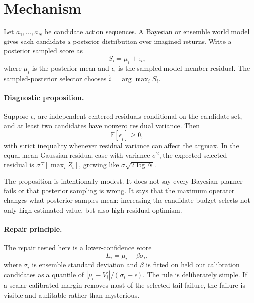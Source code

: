 \documentclass{article}
\begin{document}
\section{Mechanism}

Let $a_1,\ldots,a_N$ be candidate action sequences. A Bayesian or ensemble
world model gives each candidate a posterior distribution over imagined
returns. Write a posterior sampled score as
\begin{equation}
    S_i = \mu_i + \epsilon_i,
\end{equation}
where $\mu_i$ is the posterior mean and $\epsilon_i$ is the sampled
model-member residual. The sampled-posterior selector chooses
$\hat{i}=\arg\max_i S_i$.

\paragraph{Diagnostic proposition.}
Suppose $\epsilon_i$ are independent centered residuals conditional on the
candidate set, and at least two candidates have nonzero residual variance.
Then
\begin{equation}
    \mathbb{E}\left[\epsilon_{\hat{i}}\right] \geq 0,
\end{equation}
with strict inequality whenever residual variance can affect the argmax. In
the equal-mean Gaussian residual case with variance $\sigma^2$, the expected
selected residual is $\sigma \mathbb{E}[\max_i Z_i]$, growing like
$\sigma\sqrt{2\log N}$.

The proposition is intentionally modest. It does not say every Bayesian
planner fails or that posterior sampling is wrong. It says that the maximum
operator changes what posterior samples mean: increasing the candidate budget
selects not only high estimated value, but also high residual optimism.

\paragraph{Repair principle.}
The repair tested here is a lower-confidence score
\begin{equation}
    L_i = \mu_i - \beta \sigma_i,
\end{equation}
where $\sigma_i$ is ensemble standard deviation and $\beta$ is fitted on held
out calibration candidates as a quantile of
$|\mu_i - V_i|/(\sigma_i+\epsilon)$. The rule is deliberately simple. If a
scalar calibrated margin removes most of the selected-tail failure, the
failure is visible and auditable rather than mysterious.
\end{document}
